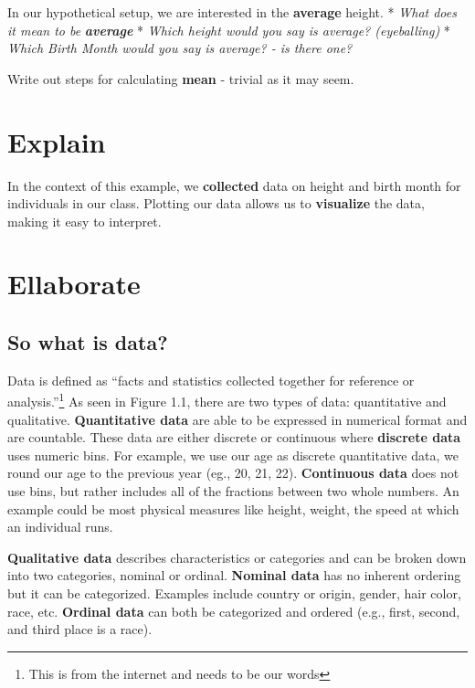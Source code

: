 \documentclass[
]{book}
\begin{document}
In our hypothetical setup, we are interested in the \textbf{average} height.
* \emph{What does it mean to be} \textbf{\emph{average}}
* \emph{Which height would you say is average? (eyeballing)}
* \emph{Which Birth Month would you say is average? - is there one?}

Write out steps for calculating \textbf{mean} - trivial as it may seem.

\hypertarget{explain-1}{%
\section{Explain}\label{explain-1}}

In the context of this example, we \textbf{collected} data on height and birth month for individuals in our class.
Plotting our data allows us to \textbf{visualize} the data, making it easy to interpret.

\hypertarget{ellaborate}{%
\section{Ellaborate}\label{ellaborate}}

\hypertarget{so-what-is-data}{%
\subsection{So what is data?}\label{so-what-is-data}}

Data is defined as ``facts and statistics collected together for
reference or analysis.''\footnote{This is from the internet and needs to
  be our words} As seen in Figure 1.1, there are two types of data:
quantitative and qualitative. \textbf{Quantitative data} are able to
be expressed in numerical format and are countable. These data
are either discrete or continuous where \textbf{discrete data} uses
numeric bins. For example, we use our age as discrete
quantitative data, we round our age to the previous year (eg.,
20, 21, 22). \textbf{Continuous data} does not use bins, but rather
includes all of the fractions between two whole numbers. An
example could be most physical measures like height, weight, the
speed at which an individual runs.

\textbf{Qualitative data} describes characteristics or categories and
can be broken down into two categories, nominal or ordinal.
\textbf{Nominal data} has no inherent ordering but it can be
categorized. Examples include country or origin, gender, hair
color, race, etc. \textbf{Ordinal data} can both be categorized and
ordered (e.g., first, second, and third place is a race).
\end{document}
